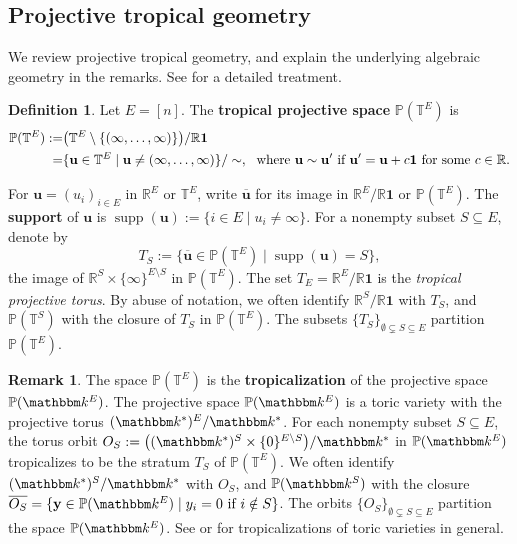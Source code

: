 \documentclass[11pt]{amsart}
\newcommand{\RR}{\mathbb R}
\newcommand{\PP}{\mathbb P}
\newcommand{\TT}{\mathbb T}
\newcommand{\kk}{\mathbbm k}
\newcommand{\bu}{{\mathbf u}}
\theoremstyle{definition}
\newtheorem{defn}[thm]{Definition}
\newtheorem{rem}[thm]{Remark}
\begin{document}
\subsection{Projective tropical geometry}
\label{subsec:projtropgeo}

We review projective tropical geometry, and explain the underlying algebraic geometry in the remarks.  See \cite[Chapter 6]{MS15} for a detailed treatment.%

\begin{defn}
Let $E = [n]$. The \textbf{tropical projective space} $\PP(\TT^E)$ is 
\[
\begin{split}
\PP(\TT^E) :=& \big(\TT^E \setminus \{(\infty, \ldots, \infty)\} \big) / \RR\mathbf 1\\
=& \{ \bu \in \TT^E \mid \bu \neq (\infty, \ldots, \infty)\}/ \sim, \ \ \textnormal{where $\bu\sim \bu'$ if $\bu' = \bu+ c\mathbf 1$ for some $c\in \RR$.}
\end{split}
\]
\end{defn}

For $\bu = (u_i)_{i\in E}$ in $\RR^E$ or $\TT^E$, write $\overline \bu$ for its image in $\RR^E/\RR\mathbf 1$ or $\PP(\TT^E)$.  The \textbf{support} of $\bu$ is $\operatorname{supp}(\bu) := \{i\in E \mid u_i \neq \infty\}$.  For a nonempty subset $S\subseteq E$, denote by
\[
T_S := \{\overline \bu \in \PP(\TT^E) \mid \operatorname{supp}(\bu) = S\},
\]
the image of $\RR^{S}\times \{\infty\}^{E\setminus S}$ in $\PP(\TT^E)$. The set $T_E = \RR^E/\RR\mathbf 1$ is the \emph{tropical projective torus}. By abuse of notation, we often identify $\RR^S/\RR\mathbf 1$ with $T_S$, and $\PP(\TT^{S})$ with the closure of $T_S$ in $\PP(\TT^E)$.  The subsets $\{T_S\}_{\emptyset \subsetneq S\subseteq E}$ partition $\PP(\TT^E)$.

\begin{rem}
The space $\PP(\TT^E)$ is the \textbf{tropicalization} of the projective space $\PP(\kk^E)$.  The projective space $\PP(\kk^E)$ is a toric variety with the projective torus $(\kk^*)^E/\kk^*$.  For each nonempty subset $S\subseteq E$, the torus orbit $O_S := \big((\kk^*)^{S}\times \{0\}^{E\setminus S}\big) /\kk^*$ in $\PP(\kk^E)$ tropicalizes to be the stratum $T_S$ of $\PP(\TT^E)$.  We often identify $(\kk^*)^S/\kk^*$ with $O_S$, and $\PP(\kk^S)$ with the closure $\overline{O_S} = \{\mathbf y\in \PP(\kk^E) \mid y_i = 0 \textnormal{ if } i\notin S\}$.  The orbits $\{O_S\}_{\emptyset\subsetneq S \subseteq E}$ partition the space $\PP(\kk^E)$.  See \cite[\S6.2]{MS15} or \cite[\S3.2]{MR} for tropicalizations of toric varieties in general.
\end{rem}
\end{document}

